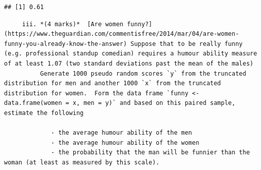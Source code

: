 \documentclass[
  9pt,
]{article}
\newenvironment{Shaded}{\begin{snugshade}}{\end{snugshade}}
\newcommand{\CommentTok}[1]{\textcolor[rgb]{0.56,0.35,0.01}{\textit{#1}}}
\newcommand{\ControlFlowTok}[1]{\textcolor[rgb]{0.13,0.29,0.53}{\textbf{#1}}}
\newcommand{\DataTypeTok}[1]{\textcolor[rgb]{0.13,0.29,0.53}{#1}}
\newcommand{\DecValTok}[1]{\textcolor[rgb]{0.00,0.00,0.81}{#1}}
\newcommand{\FloatTok}[1]{\textcolor[rgb]{0.00,0.00,0.81}{#1}}
\newcommand{\KeywordTok}[1]{\textcolor[rgb]{0.13,0.29,0.53}{\textbf{#1}}}
\newcommand{\NormalTok}[1]{#1}
\newcommand{\OperatorTok}[1]{\textcolor[rgb]{0.81,0.36,0.00}{\textbf{#1}}}
\newcommand{\StringTok}[1]{\textcolor[rgb]{0.31,0.60,0.02}{#1}}
\begin{document}
\begin{verbatim}
## [1] 0.61
\end{verbatim}

\begin{verbatim}
     iii. *(4 marks)*  [Are women funny?](https://www.theguardian.com/commentisfree/2014/mar/04/are-women-funny-you-already-know-the-answer) Suppose that to be really funny (e.g. professional standup comedian) requires a humour ability measure of at least 1.07 (two standard deviations past the mean of the males)
          Generate 1000 pseudo random scores `y` from the truncated distribution for men and another 1000 `x` from the truncated distribution for women.  Form the data frame `funny <- data.frame(women = x, men = y)` and based on this paired sample, estimate the following
         
             - the average humour ability of the men
             - the average humour ability of the women
             - the probability that the man will be funnier than the woman (at least as measured by this scale).
             
\end{verbatim}

\begin{Shaded}
\end{Shaded}
\end{document}

